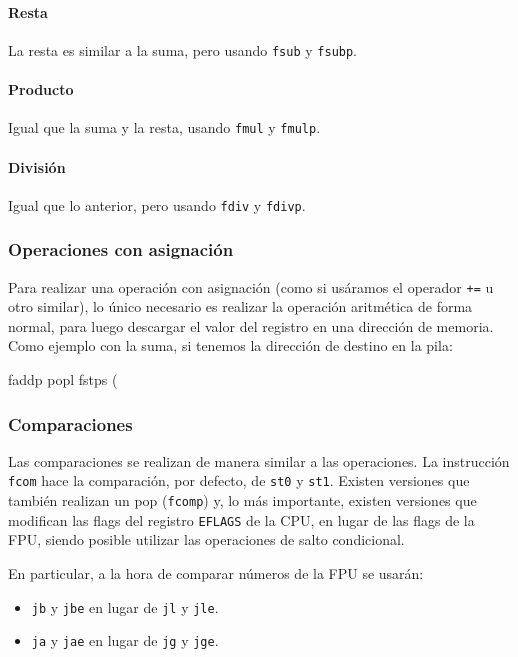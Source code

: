 \documentclass[11pt]{scrartcl}
\begin{document}
\paragraph{Resta}

La resta es similar a la suma, pero usando \texttt{fsub} y \texttt{fsubp}.

\paragraph{Producto}

Igual que la suma y la resta, usando \texttt{fmul} y \texttt{fmulp}.

\paragraph{División}

Igual que lo anterior, pero usando \texttt{fdiv} y \texttt{fdivp}.

\subsubsection{Operaciones con asignación}

Para realizar una operación con asignación (como si usáramos el operador
\texttt{+=} u otro similar), lo único necesario es realizar la operación
aritmética de forma normal, para luego descargar el valor del registro en una
dirección de memoria. Como ejemplo con la suma, si tenemos la dirección de
destino en la pila:

\begin{gascode}
  faddp %
  popl %
  fstps (%
\end{gascode}

\subsubsection{Comparaciones}

Las comparaciones se realizan de manera similar a las operaciones. La
instrucción \texttt{fcom} hace la comparación, por defecto, de \texttt{st0} y
\texttt{st1}. Existen versiones que también realizan un pop (\texttt{fcomp}) y,
lo más importante, existen versiones que modifican las flags del registro
\texttt{EFLAGS} de la CPU, en lugar de las flags de la FPU, siendo posible
utilizar las operaciones de salto condicional.

En particular, a la hora de comparar números de la FPU se usarán:
\begin{itemize}
\item \texttt{jb} y \texttt{jbe} en lugar de \texttt{jl} y \texttt{jle}.
\item \texttt{ja} y \texttt{jae} en lugar de \texttt{jg} y \texttt{jge}.
\end{itemize}
\end{document}
